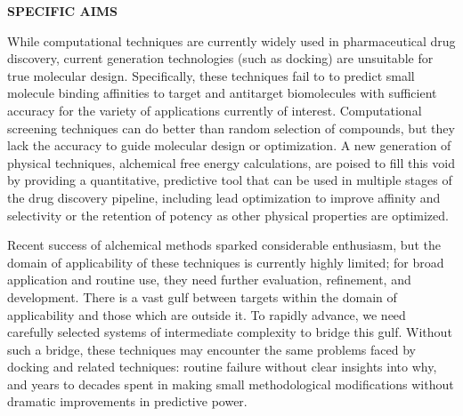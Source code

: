 \documentclass[11pt]{article}
\begin{document}





\noindent \begin{center}
{\bf SPECIFIC AIMS}
\end{center}

While computational techniques are currently widely used in pharmaceutical drug discovery, current generation technologies (such as docking) are unsuitable for true molecular design. 
Specifically, these techniques fail to to predict small molecule binding affinities to target and antitarget biomolecules with sufficient accuracy for the variety of applications currently of interest. 
Computational screening techniques can do better than random selection of compounds, but they lack the accuracy to guide molecular design or optimization. 
A new generation of physical techniques, alchemical free energy calculations, are poised to fill this void by providing a quantitative, predictive tool that can be used in multiple stages of the drug discovery pipeline, including lead optimization to improve affinity and selectivity or the retention of potency as other physical properties are optimized. 

Recent success of alchemical methods sparked considerable enthusiasm, but the domain of applicability of these techniques is currently highly limited; for broad application and routine use, they need further evaluation, refinement, and development. 
There is a vast gulf between targets within the domain of applicability and those which are outside it. 
To rapidly advance, we need carefully selected systems of intermediate complexity to bridge this gulf. 
Without such a bridge, these techniques may encounter the same problems faced by docking and related techniques: routine failure without clear insights into why, and years to decades spent in making small methodological modifications without dramatic improvements in predictive power.
\end{document}
